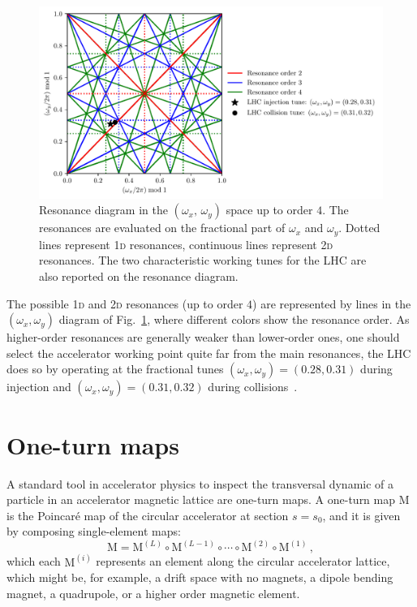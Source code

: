 \begin{figure}
	\centering
	\includegraphics[width=.85\textwidth]{2_accelerator_physics_fundamentals/figs/tune_space.pdf}
	\caption{Resonance diagram in the $(\omega_x,\,\omega_y)$ space up to order $4$. The resonances are evaluated on the fractional part of $\omega_x$ and $\omega_y$. Dotted lines represent 1\textsc{d} resonances, continuous lines represent 2\textsc{d} resonances. The two characteristic working tunes for the LHC are also reported on the resonance diagram.}
	\label{fig:res}
\end{figure}

The possible 1\textsc{d} and 2\textsc{d} resonances (up to order $4$) are represented by lines in the $(\omega_x, \omega_y)$ diagram of Fig.~\ref{fig:res}, where different colors show the resonance order. As higher-order resonances are generally weaker than lower-order ones, one should select the accelerator working point quite far from the main resonances, the LHC does so by operating at the fractional tunes $(\omega_x, \omega_y)=(0.28, 0.31)$ during injection and $(\omega_x, \omega_y)=(0.31, 0.32)$ during collisions~\cite{}.

\section{One-turn maps}

A standard tool in accelerator physics to inspect the transversal dynamic of a particle in an accelerator magnetic lattice are one-turn maps. A one-turn map \(\mathrm{M}\) is the Poincaré map of the circular accelerator at section \(s = s_0\), and it is given by composing single-element maps:
\begin{equation}
	\mathrm{M} = \mathrm{M}^{(L)} \circ \mathrm{M}^{(L - 1)} \circ \cdots \circ \mathrm{M}^{(2)} \circ \mathrm{M}^{(1)} \,,
\end{equation}
which each $\mathrm{M}^{(i)}$ represents an element along the circular accelerator lattice, which might be, for example, a drift space with no magnets, a dipole bending magnet, a quadrupole, or a higher order magnetic element. 

